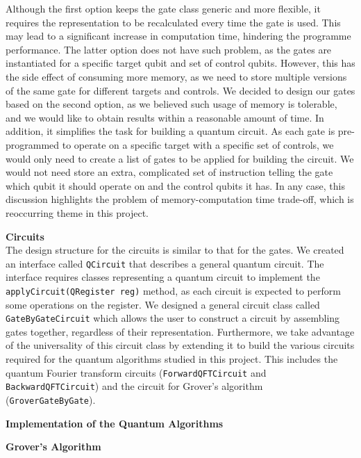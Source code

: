 \documentclass[bibliography=totocnumbered, 10pt]{article}
\newenvironment{myenumerate}{%
  \edef\backupindent{\the\parindent}%
  \enumerate%
  \setlength{\parindent}{\backupindent}%
}{\endenumerate}
\theoremstyle{NoticeStyle}
\begin{document}
\begin{myenumerate}
\begin{enumerate}[(a)]
\end{enumerate}
Although the first option keeps the gate class generic and more flexible, it requires the representation to be recalculated every time the gate is used. This may lead to a significant increase in computation time, hindering the programme performance. The latter option does not have such problem, as the gates are instantiated for a specific target qubit and set of control qubits. However, this has the side effect of consuming more memory, as we need to store multiple versions of the same gate for different targets and controls. We decided to design our gates based on the second option, as we believed such usage of memory is tolerable, and we would like to obtain results within a reasonable amount of time. In addition, it simplifies the task for building a quantum circuit. As each gate is pre-programmed to operate on a specific target with a specific set of controls, we would only need to create a list of gates to be applied for building the circuit. We would not need store an extra, complicated set of instruction telling the gate which qubit it should operate on and the control qubits it has. In any case, this discussion highlights the problem of memory-computation time trade-off, which is reoccurring theme in this project. 
	\item \textbf{Circuits}\\
	The design structure for the circuits is similar to that for the gates. We created an interface called \texttt{QCircuit} that describes a general quantum circuit. The interface requires classes representing a quantum circuit to implement the \texttt{applyCircuit(QRegister reg)} method, as each circuit is expected to perform some operations on the register. We designed a general circuit class called \texttt{GateByGateCircuit} which allows the user to construct a circuit by assembling gates together, regardless of their representation. Furthermore, we take advantage of the universality of this circuit class by extending it to build the various circuits required for the quantum algorithms studied in this project. This includes the quantum Fourier transform circuits (\texttt{ForwardQFTCircuit} and \texttt{BackwardQFTCircuit}) and the circuit for Grover's algorithm (\texttt{GroverGateByGate}).
	
	\item \textbf{Implementation of the Quantum Algorithms}\\
	\begin{myenumerate}
		\item \textbf{Grover's Algorithm}\\
		

\end{myenumerate}
\end{myenumerate}
\end{document}
